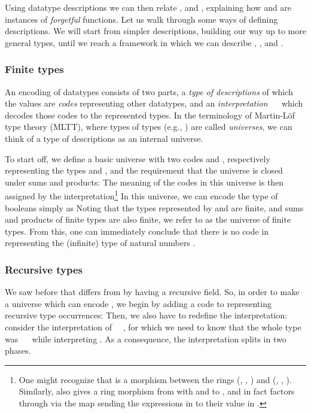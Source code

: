 Using datatype descriptions we can then relate \bN{},  and , explaining how  and  are instances of \emph{forgetful} functions. Let us walk through some ways of defining descriptions. We will start from simpler descriptions, building our way up to more general types, until we reach a framework in which we can describe \bN{}, ,  and . 


\subsubsection{Finite types}\label{ssec:background-fin}
An encoding of datatypes consists of two parts, a \emph{type of descriptions}  of which the values are \emph{codes} representing other datatypes, and an \emph{interpretation} \ \  which decodes those codes to the represented types. In the terminology of Martin-L{\"{o}}f type theory (MLTT)\cite{levitation, mltt}, where types of types (e.g., ) are called \emph{universes}, we can think of a type of descriptions as an internal universe.

To start off, we define a basic universe with two codes  and , respectively representing the types  and , and the requirement that the universe is closed under sums and products:
The meaning of the codes in this universe is then assigned by the interpretation\footnote{One might recognize that  is a morphism between the rings (, , ) and (, , ). Similarly,  also gives a ring morphism from \bN{} with \AF{+} and  to , and in fact  factors through  via the map sending the expressions in  to their value in \bN{}.}
In this universe, we can encode the type of booleans simply as 
Noting that the types represented by  and  are finite, and sums and products of finite types are also finite, we refer to  as the universe of finite types. From this, one can immediately conclude that there is no code in  representing the (infinite) type of natural numbers \bN{}.

\subsubsection{Recursive types}\label{ssec:background-rec}
We saw before that \bN{} differs from  by having a recursive field. So, in order to make a universe which can encode \bN{}, we begin by adding a code  to  representing recursive type occurrences:
Then, we also have to redefine the interpretation: consider the interpretation of \ \ , for which we need to know that the whole type was \ \  while interpreting . As a consequence, the interpretation splits in two phases. 

